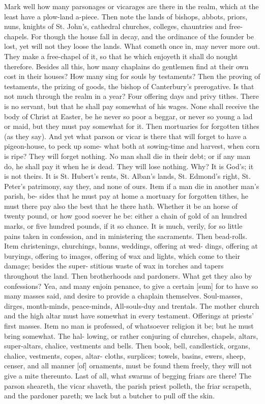 \documentclass{custom}
\begin{document}
Mark well how many parsonages or vicarages are there 
in the realm, which at the least have a plow-land a-piece. 
Then note the lands of bishops, abbots, priors, nuns, 
knights of St. John's, cathedral churches, colleges, 
chauntries and free-chapels. For though the house fall 
in decay, and the ordinance of the founder be lost, yet 
will not they loose the lands. What cometh once in, may 
never more out. They make a free-chapel of it, so that 
he which enjoyeth it shall do nought therefore. Besides 
all this, how many chaplains do gentlemen find at their 
own cost in their houses? How many sing for souls by 
testaments? Then the proving of testaments, the prizing 
of goods, the bishop of Canterbury's prerogative. Is that 
not much through the realm in a year? Four offering 
days and privy tithes. There is no servant, but that he 
shall pay somewhat of his wages. None shall receive 
the body of Christ at Easter, be he never so poor a 
beggar, or never so young a lad or maid, but they must 
pay somewhat for it. Then mortuaries for forgotten tithes 
(as they say). And yet what parson or vicar is there that 
will forget to have a pigeon-house, to peck up some- 
what both at sowing-time and harvest, when corn is ripe? 
They will forget nothing. No man shall die in their 
debt; or if any man do, he shall pay it when he is dead. 
They will lose nothing. Why? It is God's; it is not 
theirs. It is St. Hubert's rents, St. Alban's lands, St. 
Edmond's right, St. Peter's patrimony, say they, and none 
of ours. Item if a man die in another man's parish, be- 
sides that he must pay at home a mortuary for forgotten 
tithes, he must there pay also the best that he there hath. 
Whether it be an horse of twenty pound, or how good 
soever he be: either a chain of gold of an hundred 
marks, or five hundred pounds, if it so chance. It is 
much, verily, for so little pains taken in confession, and 
in ministering the sacraments. Then bead-rolls. Item 
christenings, churchings, banns, weddings, offering at wed- 
dings, offering at buryings, offering to images, offering of wax 
and lights, which come to their damage; besides the super- 
stitious waste of wax in torches and tapers throughout 
the land. Then brotherhoods and pardoners. What get 
they also by confessions? Yea, and many enjoin penance, 
to give a certain [sum] for to have so many masses said, and 
desire to provide a chaplain themselves. Soul-masses, 
dirges, month-minds, peace-minds, All-souls-duy and 
trentals. The mother church and the high altar must 
have somewhat in every testament. Offerings at priests' 
first masses. Item no man is professed, of whatsoever 
religion it be; but he must bring somewhat. The hal- 
lowing, or rather conjuring of churches, chapels, altars, 
super-altars, chalice, vestments and bells. Then book, 
bell, candlestick, organs, chalice, vestments, copes, altar- 
cloths, surplices; towels, basins, ewers, sheep, censer, 
and all manner [of] ornaments, must be found them freely, 
they will not give a mite thereunto. Last of all, what 
swarms of begging friars are there! The parson sheareth, 
the vicar shaveth, the parish priest polleth, the friar 
scrapeth, and the pardoner pareth; we lack but a butcher 
to pull off the skin. 
\end{document}
